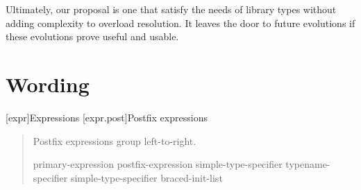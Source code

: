 \documentclass{wg21}
\begin{document}
Ultimately, our proposal is one that satisfy the needs of library types without adding complexity to overload resolution.
It leaves the door to future evolutions if these evolutions prove useful and usable.

\section{Wording}

[expr]{Expressions}
[expr.post]{Postfix expressions}%

\begin{quote}
\pnum
Postfix expressions group left-to-right.

\begin{bnf}
primary-expression
postfix-expression \terminal{(}  \terminal{)}
simple-type-specifier \terminal{(}  \terminal{)}
typename-specifier \terminal{(}  \terminal{)}
simple-type-specifier braced-init-list
\end{bnf}
\end{quote}
\end{document}
